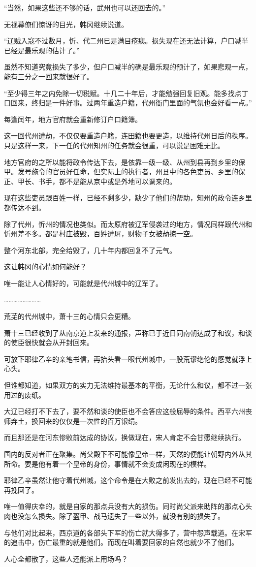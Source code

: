 “当然，如果这些还不够的话，武州也可以还回去的。”

无视幕僚们惊讶的目光，韩冈继续说道。

“辽贼入寇不过数月，忻、代二州已是满目疮痍。损失现在还无法计算，户口减半已经是最乐观的估计了。”

虽然不知道究竟损失了多少，但户口减半的确是最乐观的预计了，如果悲观一点，能有三分之一回来就很好了。

“至少得三年之内免除一切税赋。十几二十年后，才能勉强回复旧观。能多找点丁口回来，终归是一件好事。过两年重造户籍，代州衙门里面的气氛也会好看一点。”

每逢闰年，地方官府就会重新修订户口籍簿。

这一回代州遭劫，不仅仅要重造户籍，连田籍也要更造，以维持代州日后的秩序。只是这样一来，下一任的代州知州的任务就会很重，可以说是困难无比。

地方官府的之所以能将政令传达下去，是依靠一级一级、从州到县再到乡里的保甲。发号施令的官员好任命，但实际上的执行者，州县中的各色吏员、乡里的保正、甲长、书手，都不是能从京中或是外地可以调来的。

现在这些吏员跟百姓一样，已经不剩多少，缺少了他们的帮助，知州的政令连乡里都传达不到。

除了代州，忻州的情况也类似。而太原府被辽军侵袭过的地方，情况同样跟代州和忻州差不多。都是村庄被毁，百姓遭屠，财物子女被劫掠一空。

整个河东北部，完全给毁了，几十年内都回复不了元气。

这让韩冈的心情如何能好？

唯一能让人心情好的，可能就是代州城中的辽军了。

……………………

荒芜的代州城中，萧十三的心情只会更糟。

萧十三已经收到了从南京道上发来的通报，声称已于近日同南朝达成了和议，和谈的使臣很快就会从开封回来。

可放下耶律乙辛的亲笔书信，再抬头看一眼代州城中，一股荒谬绝伦的感觉就浮上心头。

但谁都知道，如果双方的实力无法维持最基本的平衡，无论什么和议，都不过一张用过的废纸。

大辽已经打不下去了，要不然和谈的使臣也不会答应这般屈辱的条件。西平六州丧师弃土，换回来的仅仅是一次性的百万银绢。

而且那还是在河东惨败前达成的协议，换做现在，宋人肯定不会甘愿继续执行。

国内的反对者正在聚集。尚父殿下不可能像皇帝一样，天然的便能让朝野内外从其所命。要是他有着一个皇帝的身份，事情就不会变成闲现在的模样。

耶律乙辛虽然让他守着代州城，这个命令是在大败之前发出去的，现在已经不可能再挽回了。

唯一值得庆幸的，就是自家的那点兵没有大的损伤。同时尚父派来助阵的那点心头肉也没怎么损失。除了盔甲、战马遗失了一些以外，就没有别的损失了。

与他们对比起来，西京道的各部头下军的伤亡就大得多了，营中怨声载道。在宋军的追击中，伤亡最重的就是他们。而现在叫着要回家的自然也就少不了他们。

人心全都散了，这些人还能派上用场吗？
